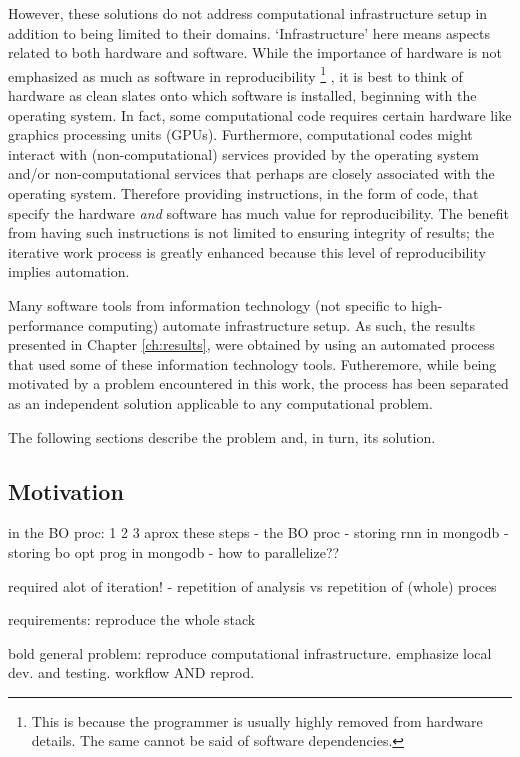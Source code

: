 However, these solutions do not address computational infrastructure setup in addition to being limited to their domains.
%
`Infrastructure' here means aspects related to both hardware and software.
%
While the importance of hardware is not emphasized as much as software in reproducibility%
\footnote{This is because the programmer is usually highly removed from hardware details. The same cannot be said of software dependencies.}%
,
it is best to think of hardware as clean slates onto which software is installed, beginning with the operating system.
%
In fact, some computational code requires certain hardware like graphics processing units (GPUs).
%
Furthermore, computational codes might interact with (non-computational) services provided by the operating system and/or non-computational services that perhaps are closely associated with the operating system.
%
Therefore providing instructions, in the form of code, that specify the hardware \emph{and} software has much value for reproducibility.
%
The benefit from having such instructions is not limited to ensuring integrity of results;
%
the iterative work process is greatly enhanced because this level of reproducibility implies automation.


Many software tools from information technology (not specific to high-performance computing) automate infrastructure setup.
%
As such, the results presented in Chapter \ref{ch:results}, were obtained by using an automated process that used some of these information technology tools.
%
Futheremore, while being motivated by a problem encountered in this work, the process has been separated as an independent solution applicable to any computational problem.


The following sections describe the problem and, in turn, its solution.


\subsection{Motivation}


in the BO proc: 1 2 3 aprox these steps
- the BO proc
- storing rnn in mongodb
- storing bo opt prog in mongodb
- how to parallelize??


required alot of iteration!
- repetition of analysis vs repetition of (whole) proces

requirements: reproduce the whole stack

bold general problem: reproduce computational infrastructure. emphasize local dev. and testing. workflow AND reprod.



